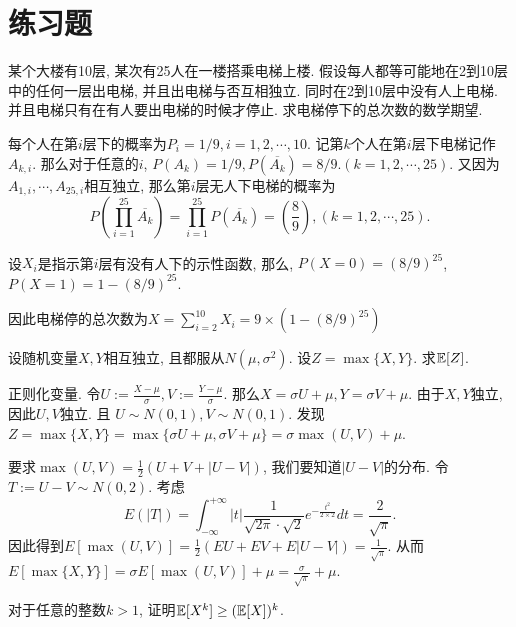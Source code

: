 \section*{练习题}

\begin{exercise}
    某个大楼有10层, 某次有25人在一楼搭乘电梯上楼. 假设每人都等可能地在2到10层中的任何一层出电梯, 并且出电梯与否互相独立. 同时在2到10层中没有人上电梯. 并且电梯只有在有人要出电梯的时候才停止. 求电梯停下的总次数的数学期望. 
\end{exercise}

\begin{solution*}
每个人在第$i$层下的概率为$P_i=1/9, i=1,2,\cdots, 10$. 记第$k$个人在第$i$层下电梯记作$A_{k,i}$. 那么对于任意的$i$, $P(A_k)=1/9, P(\overline{A_k})=8/9. (k=1,2,\cdots, 25)$. 又因为$A_{1, i}, \cdots, A_{25, i}$相互独立, 那么第$i$层无人下电梯的概率为
$$
P\left(\prod_{i=1}^{25} \overline{A_k}\right) = \prod_{i=1}^{25}P\left(\overline{A_k}\right) = \left(\frac89\right), (k=1,2,\cdots, 25).
$$

设$X_i$是指示第$i$层有没有人下的示性函数, 那么, $P(X=0)=(8/9)^{25}$, $P(X=1)=1-(8/9)^{25}$.

因此电梯停的总次数为$X=\sum_{i=2}^{10}X_i=9\times\left(1-(8/9)^{25}\right)$
\end{solution*}

\begin{exercise}
    设随机变量$X,Y$相互独立, 且都服从$N(\mu, \sigma^2)$. 设$Z=\max\{X,Y\}$. 求$\mathbb E[Z]$.
\end{exercise}

\begin{solution*}
    正则化变量. 令$U:=\frac{X-\mu}{\sigma}, V:=\frac{Y-\mu}{\sigma}$. 那么$X=\sigma U+\mu, Y=\sigma V+\mu$. 由于$X,Y$独立, 因此$U,V$独立. 且 $U \sim N(0,1), V \sim N(0,1)$. 发现$Z=\max \{X, Y\}=\max \{\sigma U+\mu, \sigma V+\mu\}=\sigma \max (U, V)+\mu$.

    要求$\max (U, V)=\frac{1}{2}(U+V+|U-V|)$, 我们要知道$|U-V|$的分布. 令$T:=U-V \sim N(0,2)$. 考虑$$E(|T|)=\int_{-\infty}^{+\infty}|t| \frac{1}{\sqrt{2 \pi} \cdot \sqrt{2}} e^{-\frac{t^2}{2 \times 2}} d t=\frac{2}{\sqrt{\pi}}.$$ 因此得到$E[\max (U, V)]=\frac{1}{2}(E U+E V+E|U-V|)=\frac{1}{\sqrt{\pi}}$. 从而$E[\max \{X, Y\}]=\sigma E[\max (U, V)]+\mu=\frac{\sigma}{\sqrt{\pi}}+\mu$. 
\end{solution*}

\begin{exercise}
    对于任意的整数$k>1$, 证明$\mathbb E[X^k]\geq (\mathbb E[X])^k$.
\end{exercise}

